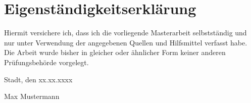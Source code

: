\chapter*{Eigenständigkeitserklärung}

Hiermit versichere ich, dass ich die vorliegende Masterarbeit selbstständig und nur unter
Verwendung der angegebenen Quellen und Hilfsmittel verfasst habe. Die Arbeit wurde bisher
in gleicher oder ähnlicher Form keiner anderen Prüfungsbehörde vorgelegt.

\vskip 1cm

Stadt, den xx.xx.xxxx

\vskip 1.5cm

Max Mustermann